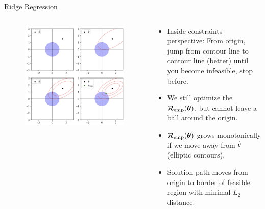 \documentclass[11pt,compress,t,notes=noshow, xcolor=table]{beamer}
\begin{document}
\begin{vbframe}{Ridge Regression}
\framebreak

\begin{columns}
\begin{column}{0.5\textwidth}
\lz
\begin{figure}
\includegraphics[width=\textwidth]{figure/ridge_inside.png}
\end{figure}
\end{column}

\begin{column}{0.5\textwidth}
\begin{footnotesize} 
\begin{itemize}
  \item Inside constraints perspective: From origin, jump from contour line to contour line (better) until you become infeasible, stop before.
  \item We still optimize the $\mathcal{R}_{\text{emp}}(\bm{\theta})$, but cannot leave a ball around the origin.
  \item $\mathcal{R}_{\text{emp}}(\bm{\theta})$ grows monotonically if we move away from $\hat{\theta}$ (elliptic contours).
  \item Solution path moves from origin to border of feasible region with minimal $L_2$ distance.
\end{itemize}
\end{footnotesize}
\end{column}
\end{columns}



\end{vbframe}
\end{document}
